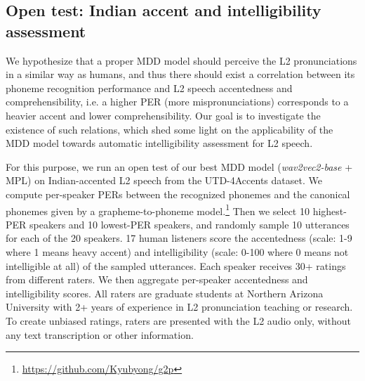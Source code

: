 \documentclass[a4paper]{article}
\begin{document}
\subsection{Open test: Indian accent and intelligibility assessment} \label{res:open_test}
 We hypothesize that a proper MDD model should perceive the L2 pronunciations in a similar way as humans, and thus there should exist a correlation between its phoneme recognition performance and L2 speech accentedness and comprehensibility, i.e. a higher PER (more mispronunciations) corresponds to a heavier accent and lower comprehensibility. Our goal is to investigate the existence of such relations, which shed some light on the applicability of the MDD model towards automatic intelligibility assessment for L2 speech. 

For this purpose, we run an open test of our best MDD model (\textit{wav2vec2-base} + MPL) on Indian-accented L2 speech from the UTD-4Accents dataset. We compute per-speaker PERs between the recognized phonemes and the canonical phonemes given by a grapheme-to-phoneme model.\footnote{\url{https://github.com/Kyubyong/g2p}} Then we select 10 highest-PER speakers and 10 lowest-PER speakers, and randomly sample 10 utterances for each of the 20 speakers. 17 human listeners score the accentedness (scale: 1-9 where 1 means heavy accent) and intelligibility (scale: 0-100 where 0 means not intelligible at all) of the sampled utterances. Each speaker receives 30+ ratings from different raters. We then aggregate per-speaker accentedness and intelligibility scores. All raters are graduate students at Northern Arizona University with 2+ years of experience in L2 pronunciation teaching or research. To create unbiased ratings, raters are presented with the L2 audio only, without any text transcription or other information. 
\end{document}
